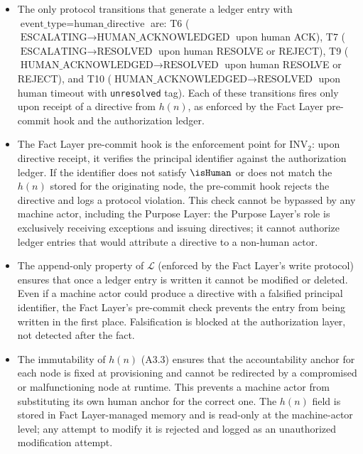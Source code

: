 \begin{itemize}
\item[\textbf{Step 1.}] The only protocol transitions that generate a ledger entry with $\text{event\_type} = \text{human\_directive}$ are: T6 ($\text{ESCALATING} \rightarrow \text{HUMAN\_ACKNOWLEDGED}$ upon human ACK), T7 ($\text{ESCALATING} \rightarrow \text{RESOLVED}$ upon human RESOLVE or REJECT), T9 ($\text{HUMAN\_ACKNOWLEDGED} \rightarrow \text{RESOLVED}$ upon human RESOLVE or REJECT), and T10 ($\text{HUMAN\_ACKNOWLEDGED} \rightarrow \text{RESOLVED}$ upon human timeout with \texttt{unresolved} tag). Each of these transitions fires only upon receipt of a directive from $h(n)$, as enforced by the Fact Layer pre-commit hook and the authorization ledger.

\item[\textbf{Step 2.}] The Fact Layer pre-commit hook is the enforcement point for INV$_2$: upon directive receipt, it verifies the principal identifier against the authorization ledger. If the identifier does not satisfy $\isHuman$ or does not match the $h(n)$ stored for the originating node, the pre-commit hook rejects the directive and logs a protocol violation. This check cannot be bypassed by any machine actor, including the Purpose Layer: the Purpose Layer's role is exclusively receiving exceptions and issuing directives; it cannot authorize ledger entries that would attribute a directive to a non-human actor.

\item[\textbf{Step 3.}] The append-only property of $\mathcal{L}$ (enforced by the Fact Layer's write protocol) ensures that once a ledger entry is written it cannot be modified or deleted. Even if a machine actor could produce a directive with a falsified principal identifier, the Fact Layer's pre-commit check prevents the entry from being written in the first place. Falsification is blocked at the authorization layer, not detected after the fact.

\item[\textbf{Step 4.}] The immutability of $h(n)$ (A3.3) ensures that the accountability anchor for each node is fixed at provisioning and cannot be redirected by a compromised or malfunctioning node at runtime. This prevents a machine actor from substituting its own human anchor for the correct one. The $h(n)$ field is stored in Fact Layer-managed memory and is read-only at the machine-actor level; any attempt to modify it is rejected and logged as an unauthorized modification attempt.
\end{itemize}

